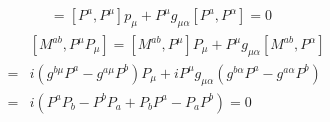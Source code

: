 \documentclass[11pt]{article}
\begin{document}
\section{ }
\begin{eqnarray}
  [ P^a,  P^\mu P_\mu ] = [P^a,P^\mu] p_\mu+P^\mu g_{\mu\alpha} [P^a,P^\alpha]=0
\end{eqnarray}
\begin{eqnarray}
 &&[ M^{ab}, P^\mu P_\mu ] =[ M^{ab}, P^\mu]P_\mu+P^\mu g_{\mu\alpha}[ M^{ab}, P^\alpha] \\
  &=& i(g^{b\mu}P^a-g^{a\mu}P^b)P_\mu +iP^\mu g_{\mu\alpha}(g^{b\alpha}P^a-g^{a\alpha}P^b)  \\
  &=&i(P^aP_b-P^bP_a+P_bP^a-P_aP^b)= 0
\end{eqnarray}

\section{ }
\end{document}

